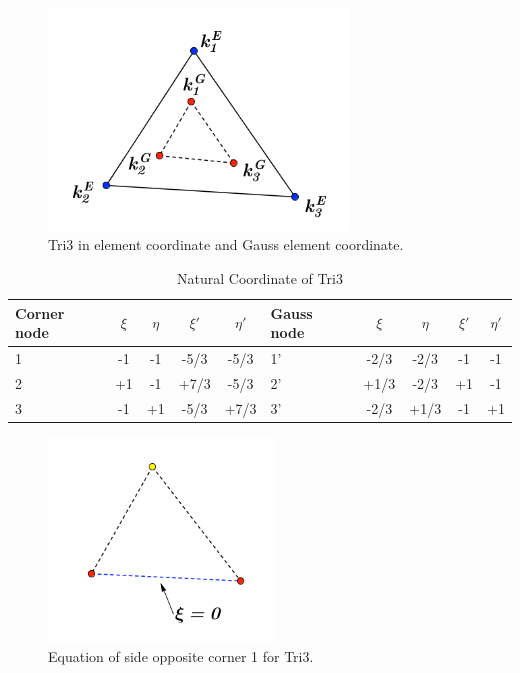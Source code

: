 \begin{figure}[h]
	\begin{center}
		\includegraphics[width=8cm,clip]{Tri3_1.pdf}			
		\caption{Tri3 in element coordinate and Gauss element coordinate.} \label{fig: Tri3_1}
	\end{center} 
\end{figure}

\begin{table}
	\centering
	\caption{Natural Coordinate of Tri3} \label{tab: Tri3}
	\begin{tabular}{p{1cm}ccccp{1cm}cccc}	
		
		\hline
		Corner node\centering& $\xi$& $\eta$& $\xi'$& $\eta'$& Gauss node\centering& $\xi$& $\eta$& $\xi'$& $\eta'$ \\
		\hline
		1\centering& -1& -1& -5/3& -5/3& 1'\centering& -2/3& -2/3& -1& -1 \\
		2\centering& +1& -1& +7/3& -5/3& 2'\centering&+1/3 & -2/3& +1& -1 \\
		3\centering& -1& +1& -5/3& +7/3& 3'\centering& -2/3& +1/3& -1& +1\\
		\hline
		
	\end{tabular}
\end{table}			



\begin{figure}[h]
	\begin{center}
		\includegraphics[width=6cm,clip]{Tri3_2.pdf}			
		\caption{Equation of side opposite corner 1 for Tri3.} \label{fig: Tri3_2}
	\end{center} 
\end{figure}

